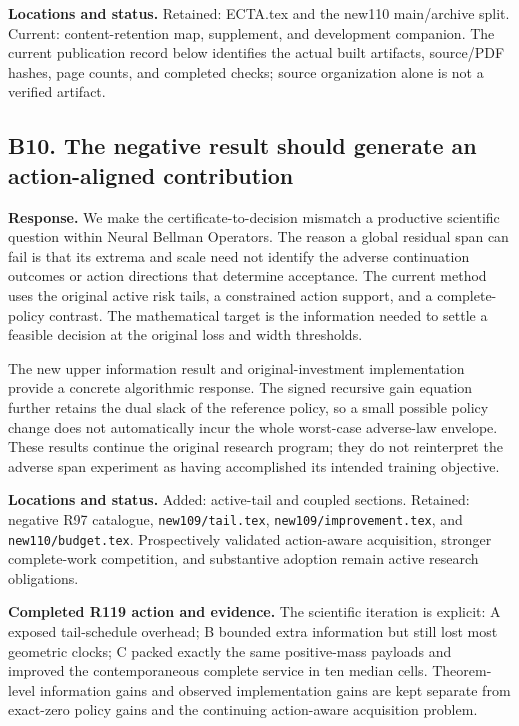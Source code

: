 \textbf{Locations and status.} Retained: ECTA.tex and the new110 main/archive split. Current: content-retention map, supplement, and development companion. The current publication record below identifies the actual built artifacts, source/PDF hashes, page counts, and completed checks; source organization alone is not a verified artifact.

\hypertarget{b10.-the-negative-result-should-generate-an-action-aligned-contribution}{%
\subsection{B10. The negative result should generate an action-aligned contribution}\label{b10.-the-negative-result-should-generate-an-action-aligned-contribution}}

\textbf{Response.} We make the certificate-to-decision mismatch a productive scientific question within Neural Bellman Operators. The reason a global residual span can fail is that its extrema and scale need not identify the adverse continuation outcomes or action directions that determine acceptance. The current method uses the original active risk tails, a constrained action support, and a complete-policy contrast. The mathematical target is the information needed to settle a feasible decision at the original loss and width thresholds.

The new upper information result and original-investment implementation provide a concrete algorithmic response. The signed recursive gain equation further retains the dual slack of the reference policy, so a small possible policy change does not automatically incur the whole worst-case adverse-law envelope. These results continue the original research program; they do not reinterpret the adverse span experiment as having accomplished its intended training objective.

\textbf{Locations and status.} Added: active-tail and coupled sections. Retained: negative R97 catalogue, \nolinkurl{new109/tail.tex}, \nolinkurl{new109/improvement.tex}, and \nolinkurl{new110/budget.tex}. Prospectively validated action-aware acquisition, stronger complete-work competition, and substantive adoption remain active research obligations.

\textbf{Completed R119 action and evidence.} The scientific iteration is explicit: A exposed tail-schedule overhead; B bounded extra information but still lost most geometric clocks; C packed exactly the same positive-mass payloads and improved the contemporaneous complete service in ten median cells. Theorem-level information gains and observed implementation gains are kept separate from exact-zero policy gains and the continuing action-aware acquisition problem.

